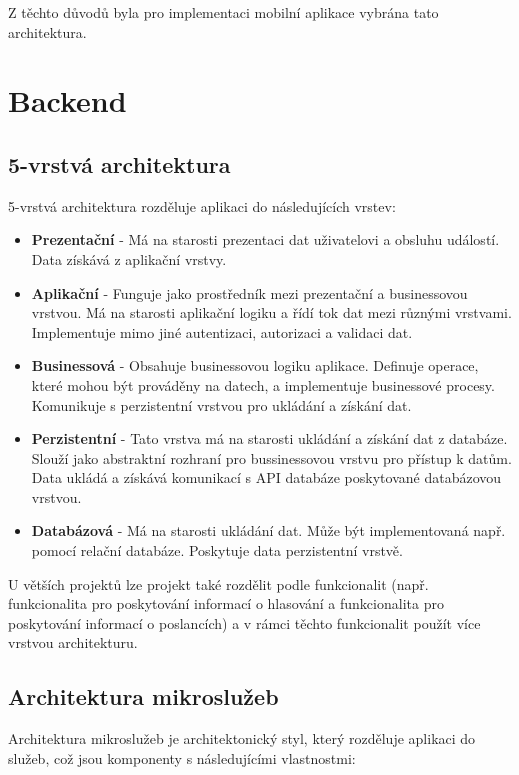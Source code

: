 \noindent Z těchto důvodů byla pro implementaci mobilní aplikace vybrána tato architektura. 

\section{Backend}

\subsection{5-vrstvá architektura}
5-vrstvá architektura \cite{5-tier} rozděluje aplikaci do následujících vrstev:


\begin{itemize}
	\item \textbf{Prezentační} - Má na starosti prezentaci dat uživatelovi a obsluhu událostí. Data získává \linebreak z aplikační vrstvy.
	
	\item \textbf{Aplikační} - Funguje jako prostředník mezi prezentační a businessovou vrstvou. Má na starosti aplikační logiku a řídí tok dat mezi různými vrstvami. Implementuje mimo jiné autentizaci, autorizaci a validaci dat.
	
	\item \textbf{Businessová} - Obsahuje businessovou logiku aplikace. Definuje operace, které mohou být prováděny na datech, a implementuje businessové procesy. Komunikuje s perzistentní vrstvou pro ukládání a získání dat.	
	
	\item \textbf{Perzistentní} - Tato vrstva má na starosti ukládání a získání dat z databáze. Slouží jako abstraktní rozhraní pro bussinessovou vrstvu pro přístup k datům. Data ukládá a získává komunikací s API databáze poskytované databázovou vrstvou.
	
	\item \textbf{Databázová} - Má na starosti ukládání dat. Může být implementovaná např. pomocí relační databáze. Poskytuje data perzistentní vrstvě.
	
\end{itemize}

\noindent U větších projektů lze projekt také rozdělit podle funkcionalit (např. funkcionalita pro poskytování informací o hlasování a funkcionalita pro poskytování informací o poslancích) a v rámci těchto funkcionalit použít více vrstvou architekturu.

\subsection{Architektura mikroslužeb}
Architektura mikroslužeb je architektonický styl, který rozděluje aplikaci do služeb, což jsou komponenty s následujícími vlastnostmi:

